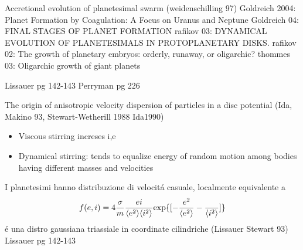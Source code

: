 \begin{workout}
	Accretional evolution of planetesimal swarm (weidenschilling 97)
	Goldreich 2004: Planet Formation by Coagulation: A Focus on Uranus and Neptune
	Goldreich 04: FINAL STAGES OF PLANET FORMATION
	rafikov 03: DYNAMICAL EVOLUTION OF PLANETESIMALS IN PROTOPLANETARY DISKS.
	rafikov 02: The growth of planetary embryos: orderly, runaway, or oligarchic?
	thommes 03: Oligarchic growth of giant planets
\end{workout}

\begin{workout}[10m-10km, 100km-1000km, 1000km-10000km: refs]
	Lissauer pg 142-143
	Perryman pg 226
\end{workout}

\begin{workout}
	The origin of anisotropic velocity dispersion of particles in a disc potential (Ida, Makino 93, Stewart-Wetherill 1988 Ida1990)
\end{workout}

\begin{workout}
	\begin{itemize}
		\item Viscous stirring increses i,e
		\item Dynamical stirring: tends to equalize energy of random motion among bodies having different masses and velocities
	\end{itemize}
\end{workout}

\begin{workout}
	I planetesimi hanno distribuzione di velocit\'a casuale, localmente equivalente a
	\begin{equation}
	f(e,i)=4\frac{\sigma}{m}\frac{ei}{\langle e^2 \rangle\langle i^2 \rangle}\text{exp}\{[-\frac{e^2}{\langle e^2 \rangle}-\frac{}{\langle i^2 \rangle}]\}
	\end{equation}
	\'e una distro gaussiana triassiale in coordinate cilindriche (Lissauer Stewart 93)
	Lissauer pg 142-143
\end{workout}

\begin{workout}
	
\end{workout}


